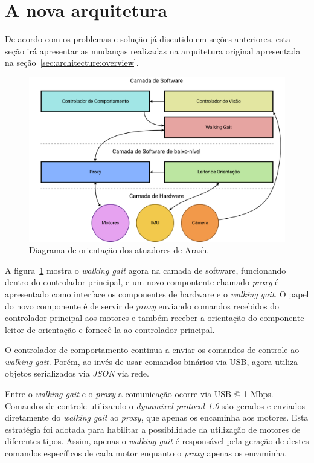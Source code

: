 \section{A nova arquitetura}

De acordo com os problemas e solução já discutido em seções anteriores, esta seção irá apresentar as mudanças realizadas na arquitetura original apresentada na seção~\ref{sec:architecture:overview}.

\begin{figure}[h!]
	\centering
	\includegraphics[scale=1]{imagens/svg/softwarearchitecture-newproposal}
	\caption{Diagrama de orientação dos atuadores de Arash.}
	\label{fig:softwarearchitecture:newproposal}
\end{figure}

A figura~\ref{fig:softwarearchitecture:newproposal} mostra o \textit{walking gait} agora na camada de software, funcionando dentro do controlador principal, e um novo compontente chamado \textit{proxy} é apresentado como interface os componentes de hardware e o \textit{walking gait}. O papel do novo componente é de servir de \textit{proxy} enviando comandos recebidos do controlador principal aos motores e também receber a orientação do componente leitor de orientação e fornecê-la ao controlador principal.

O controlador de comportamento continua a enviar os comandos de controle ao \textit{walking gait}. Porém, ao invés de usar comandos binários via USB, agora utiliza objetos serializados via \textit{JSON} via rede. 

Entre o \textit{walking gait} e o \textit{proxy} a comunicação ocorre via USB @ 1 Mbps. Comandos de controle utilizando o \textit{dynamixel protocol 1.0} são gerados e enviados diretamente do \textit{walking gait} ao \textit{proxy}, que apenas os encaminha aos motores. Esta estratégia foi adotada para habilitar a possibilidade da utilização de motores de diferentes tipos. Assim, apenas o \textit{walking gait} é responsável pela geração de destes comandos específicos de cada motor enquanto o \textit{proxy} apenas os encaminha.

